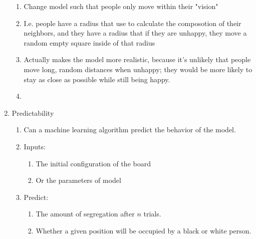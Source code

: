 \documentclass[11pt, handout]{beamer}
\begin{document}
\begin{frame}
\begin{enumerate}
\begin{enumerate}
                    \item Change model such that people only move within their "vision"
                    \item I.e. people have a radius that use to calculate the composotion of their neighbors, and they have a radius that if they are unhappy, they move a random empty square inside of that radius
                    \item Actually makes the model more realistic, because it's unlikely that people move long, random distances when unhappy; they would be more likely to stay as close as possible while still being happy.
                \item 
            \end{enumerate}
        \item Predictability
            \begin{enumerate}
                \item Can a machine learning algorithm predict the behavior of the model.
                \item Inputs: 
                    \begin{enumerate}
                        \item The initial configuration of the board 
                        \item Or the parameters of model
                    \end{enumerate}
                \item Predict:
                    \begin{enumerate}
                        \item The amount of segregation after $n$ trials.
                        \item Whether a given position will be occupied by a black or white person.
                    \end{enumerate}
            \end{enumerate}
    \end{enumerate}
\end{frame}
\end{document}
